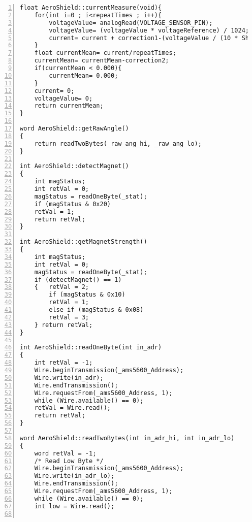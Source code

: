 \begin{lstlisting}[numbers=left,basicstyle=\tiny,caption={Zdrojový kód súboru AeroShield.cpp.},captionpos=b]
float AeroShield::currentMeasure(void){       
	for(int i=0 ; i<repeatTimes ; i++){                                            
		voltageValue= analogRead(VOLTAGE_SENSOR_PIN);                                       
		voltageValue= (voltageValue * voltageReference) / 1024;                             
		current= current + correction1-(voltageValue / (10 * ShuntRes));     
	}                                                              
	float currentMean= current/repeatTimes;             
	currentMean= currentMean-correction2;              
	if(currentMean < 0.000){                           
		currentMean= 0.000;                             
	}
	current= 0;               
	voltageValue= 0;         
	return currentMean;  
}
	
word AeroShield::getRawAngle()                                                           
{
	return readTwoBytes(_raw_ang_hi, _raw_ang_lo);                                         
}

int AeroShield::detectMagnet()                                                         
{
	int magStatus;                                                                   
	int retVal = 0;                                                                      
	magStatus = readOneByte(_stat);                                                                  
	if (magStatus & 0x20)
	retVal = 1;
	return retVal;                                                               
}

int AeroShield::getMagnetStrength()           
{
	int magStatus;                                 
	int retVal = 0;                             
	magStatus = readOneByte(_stat);               
	if (detectMagnet() == 1)                         
	{	retVal = 2;                               
		if (magStatus & 0x10)
		retVal = 1;                               
		else if (magStatus & 0x08)
		retVal = 3;                            
	} return retVal;                          
}

int AeroShield::readOneByte(int in_adr)       
{
	int retVal = -1;
	Wire.beginTransmission(_ams5600_Address);     
	Wire.write(in_adr);                            
	Wire.endTransmission();                         
	Wire.requestFrom(_ams5600_Address, 1);          
	while (Wire.available() == 0);                   
	retVal = Wire.read();                         
	return retVal;                                   
}

word AeroShield::readTwoBytes(int in_adr_hi, int in_adr_lo)     
{
	word retVal = -1;
	/* Read Low Byte */
	Wire.beginTransmission(_ams5600_Address);     
	Wire.write(in_adr_lo);                        
	Wire.endTransmission();                        
	Wire.requestFrom(_ams5600_Address, 1);          
	while (Wire.available() == 0);                  
	int low = Wire.read();                    
	

\end{lstlisting}
